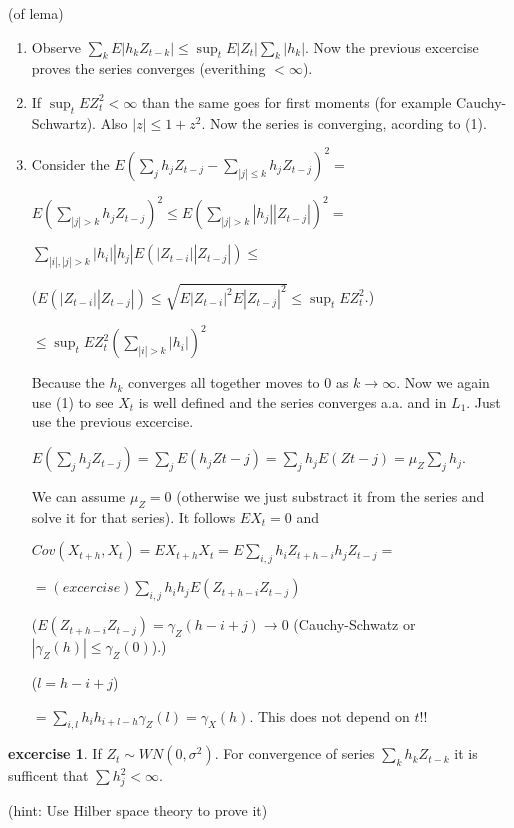 \documentclass[12pt,a4paper]{amsart}
\theoremstyle{definition} %
\newtheorem{excercise}[defn]{excercise}
\theoremstyle{plain} %
\begin{document}
\proof (of lema)
\begin{enumerate}
\item Observe $\sum_k E|h_k Z_{t-k}| \leq \sup_t E|Z_t|\sum_k |h_k|$. Now the previous excercise proves the series converges (everithing $< \infty$). 
\item If $\sup_t E Z_t^2 < \infty$ than the same goes for first moments (for example Cauchy-Schwartz). Also $|z| \leq 1 + z^2$. Now the series is converging, acording to (1). 
\item Consider the $E(\sum_j h_j Z_{t-j} - \sum_{|j|\leq k} h_j Z_{t-j})^2 =$

$ E(\sum_{|j| > k} h_j Z_{t-j})^2  \leq E(\sum_{|j| > k} |h_j| |Z_{t-j}|)^2 =$

$ \sum_{ |i|,|j| > k} |h_i||h_j| E(|Z_{t-i}||Z_{t-j}|)\leq$

($E(|Z_{t-i}||Z_{t-j}|) \leq \sqrt{E|Z_{t-i}|^2 E|Z_{t-j}|^2} \leq \sup_t E Z_t^2$.)

$\leq  \sup_t E Z_t^2 (\sum_{|i| > k} |h_i|)^2$

Because the $h_k$ converges all together moves to $0$ as $k \rightarrow \infty$. Now we again use (1) to see $X_t$ is well defined and the series converges a.a. and in $L_1$. Just use the previous excercise.

$E(\sum_j h_j Z_{t-j}) = \sum_j E(h_j Z{t-j}) = \sum_j h_j E(Z{t-j}) = \mu_Z \sum_j h_j$.

We can assume $\mu_Z = 0$ (otherwise we just substract it from the series and solve it for that series). It follows $EX_t = 0$ and 

$Cov(X_{t+h}, X_t) = E X_{t+h}X_t = E \sum_{i,j}h_i Z_{t+h-i}h_j Z_{t-j} = $

$= (excercise) \sum_{i,j} h_i h_j E(Z_{t+h-i} Z_{t-j})$

($E(Z_{t+h-i} Z_{t-j}) = \gamma_Z(h-i+j) \rightarrow 0$ (Cauchy-Schwatz or $|\gamma_Z(h)| \leq \gamma_Z(0)$).)

($l = h - i + j$)

$= \sum_{i,l}h_i h_{i+l-h} \gamma_Z(l) = \gamma_X(h)$. This does not depend on $t$!!  
\end{enumerate}
\endproof


\begin{excercise}
If $Z_t \sim WN(0, \sigma^2 )$. For convergence of series $\sum_k h_k Z_{t-k}$ it is sufficent that $\sum h_j^2 < \infty$.

(hint: Use Hilber space theory to prove it)
\end{excercise}
\end{document}
